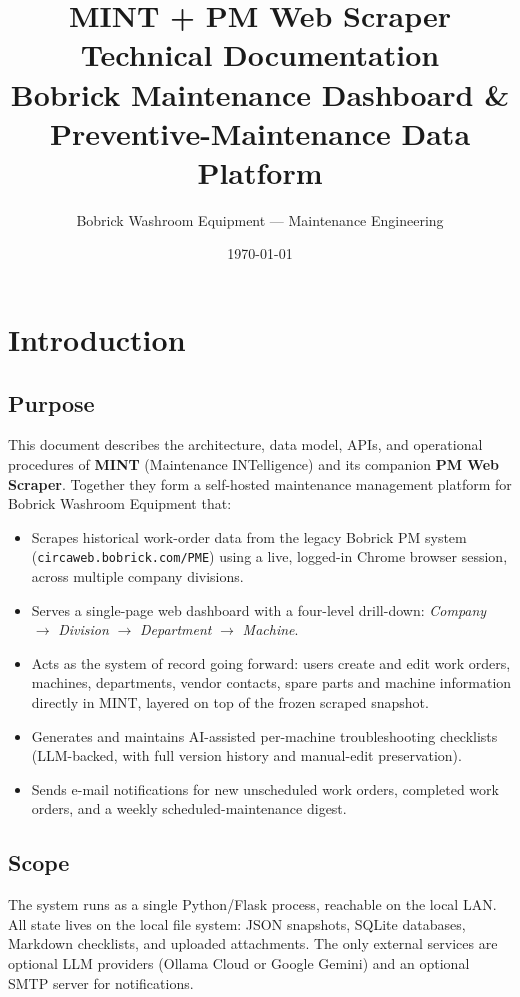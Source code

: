 \documentclass[11pt,a4paper]{article}
\title{\textbf{MINT + PM Web Scraper}\\[4pt]
       \Large Technical Documentation\\[4pt]
       \normalsize Bobrick Maintenance Dashboard \& Preventive-Maintenance Data Platform}
\author{Bobrick Washroom Equipment --- Maintenance Engineering}
\date{\today}
\newcommand{\code}[1]{\texttt{#1}}
\begin{document}
\maketitle
\tableofcontents
\newpage

\section{Introduction}

\subsection{Purpose}
This document describes the architecture, data model, APIs, and operational
procedures of \textbf{MINT} (Maintenance INTelligence) and its companion
\textbf{PM Web Scraper}. Together they form a self-hosted maintenance
management platform for Bobrick Washroom Equipment that:

\begin{itemize}
    \item Scrapes historical work-order data from the legacy Bobrick PM
          system (\code{circaweb.bobrick.com/PME}) using a live, logged-in
          Chrome browser session, across multiple company divisions.
    \item Serves a single-page web dashboard with a four-level drill-down:
          \emph{Company} $\rightarrow$ \emph{Division} $\rightarrow$
          \emph{Department} $\rightarrow$ \emph{Machine}.
    \item Acts as the system of record going forward: users create and edit
          work orders, machines, departments, vendor contacts, spare parts
          and machine information directly in MINT, layered on top of the
          frozen scraped snapshot.
    \item Generates and maintains AI-assisted per-machine troubleshooting
          checklists (LLM-backed, with full version history and manual-edit
          preservation).
    \item Sends e-mail notifications for new unscheduled work orders,
          completed work orders, and a weekly scheduled-maintenance digest.
\end{itemize}

\subsection{Scope}
The system runs as a single Python/Flask process, reachable on the local
LAN. All state lives on the local file system: JSON snapshots, SQLite
databases, Markdown checklists, and uploaded attachments. The only external
services are optional LLM providers (Ollama Cloud or Google Gemini) and an
optional SMTP server for notifications.
\end{document}

